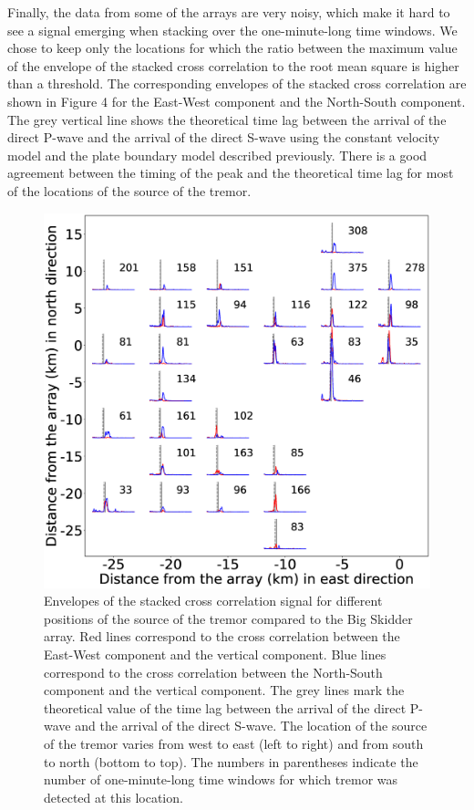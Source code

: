 \documentclass[draft]{agujournal2019}
\begin{document}
Finally, the data from some of the arrays are very noisy, which make it hard to see a signal emerging when stacking over the one-minute-long time windows. We chose to keep only the locations for which the ratio between the maximum value of the envelope of the stacked cross correlation to the root mean square is higher than a threshold. The corresponding envelopes of the stacked cross correlation are shown in Figure 4 for the East-West component and the North-South component. The grey vertical line shows the theoretical time lag between the arrival of the direct P-wave and the arrival of the direct S-wave using the constant velocity model and the plate boundary model described previously. There is a good agreement between the timing of the peak and the theoretical time lag for most of the locations of the source of the tremor.

\begin{figure}
\noindent\includegraphics[width=\textwidth, trim={26cm 14cm 69cm 35cm},clip]{figures/BS_PWS_PWS.eps}
\caption{Envelopes of the stacked cross correlation signal for different positions of the source of the tremor compared to the Big Skidder array. Red lines correspond to the cross correlation between the East-West component and the vertical component. Blue lines correspond to the cross correlation between the North-South component and the vertical component. The grey lines mark the theoretical value of the time lag between the arrival of the direct P-wave and the arrival of the direct S-wave. The location of the source of the tremor varies from west to east (left to right) and from south to north (bottom to top). The numbers in parentheses indicate the number of one-minute-long time windows for which tremor was detected at this location.}
\label{pngfiguresample}
\end{figure}
\end{document}
